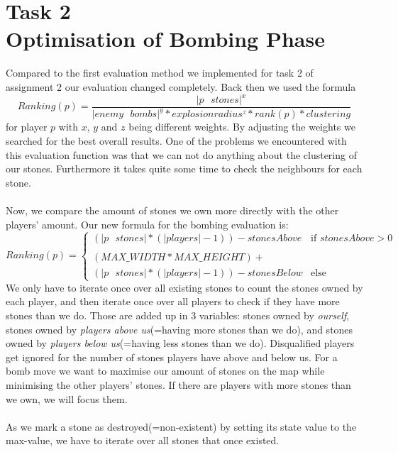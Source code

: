 \section{Task 2 \\ Optimisation of Bombing Phase}

Compared to the first evaluation method we implemented for task 2 of assignment 2 our evaluation changed completely.
Back then we used the formula\\
\[ {\displaystyle Ranking(p) = \frac{|p \text{ } stones|^x}{|enemy \text{ } bombs|^y * explosionradius^z * rank(p) * clustering}} \] for player $p$ with $x$, $y$ and $z$ being different weights. 
By adjusting the weights we searched for the best overall results.
One of the problems we encountered with this evaluation function was that we can not do anything about the clustering of our stones.
Furthermore it takes quite some time to check the neighbours for each stone. \\\\
Now, we compare the amount of stones we own more directly with the other players' amount.
Our new formula for the bombing evaluation is:
\[ Ranking(p) = \left\{
\begin{array}{ll}
(|p \text{ } stones|*(|players|-1))-stonesAbove  & \mbox{if } stonesAbove>0 \\\\
(MAX\_WIDTH*MAX\_HEIGHT)+\\(|p \text{ } stones|*(|players|-1))-stonesBelow & \mbox{else}
\end{array}
\right. \]
We only have to iterate once over all existing stones to count the stones owned by each player, and then iterate once over all players to check if they have more stones than we do. 
Those are added up in 3 variables: stones owned by \emph{ourself}, stones owned by \emph{players above us}(=having more stones than we do), and stones owned by \emph{players below us}(=having less stones than we do). Disqualified players get ignored for the number of stones players have above and below us.
For a bomb move we want to maximise our amount of stones on the map while minimising the other players' stones. If there are players with more stones than we own, we will focus them.\\\\
As we mark a stone as destroyed(=non-existent) by setting its state value to the max-value, we have to iterate over all stones that once existed.
